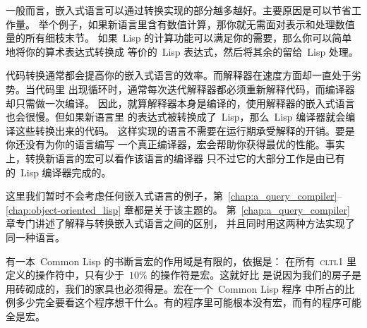 一般而言，嵌入式语言可以通过转换实现的部分越多越好。主要原因是可以节省工作量。
举个例子，如果新语言里含有数值计算，那你就无需面对表示和处理数值量的所有细枝末节。
如果~Lisp 的计算功能可以满足你的需要，那么你可以简单地将你的算术表达式转换成
等价的~Lisp 表达式，然后将其余的留给~Lisp 处理。

代码转换通常都会提高你的嵌入式语言的效率。而解释器在速度方面却一直处于劣势。当代码里
出现循环时，通常每次迭代解释器都必须重新解释代码，而编译器却只需做一次编译。
因此，就算解释器本身是编译的，使用解释器的嵌入式语言也会很慢。但如果新语言里
的表达式被转换成了~Lisp，那么~Lisp 编译器就会编译这些转换出来的代码。
这样实现的语言不需要在运行期承受解释的开销。要是你还没有为你的语言编写
一个真正编译器，宏会帮助你获得最优的性能。事实上，转换新语言的宏可以看作该语言的编译器
\pozhehao{}只不过它的大部分工作是由已有的~Lisp 编译器完成的。

这里我们暂时不会考虑任何嵌入式语言的例子，第~\ref{chap:a_query_compiler}--%
\ref{chap:object-oriented_lisp} 章都是关于该主题的。
第~\ref{chap:a_query_compiler} 章专门讲述了解释与转换嵌入式语言之间的区别，
并且同时用这两种方法实现了同一种语言。

有一本~Common Lisp 的书断言宏的作用域是有限的，依据是：
在所有~\textsc{cltl}1 里定义的操作符中，只有少于~$10\%$ 的操作符是宏。这就好比
是说因为我们的房子是用砖砌成的，我们的家具也必须得是。宏在一个~Common Lisp 程序
中所占的比例多少完全要看这个程序想干什么。有的程序里可能根本没有宏，而有的程序可能全是宏。

